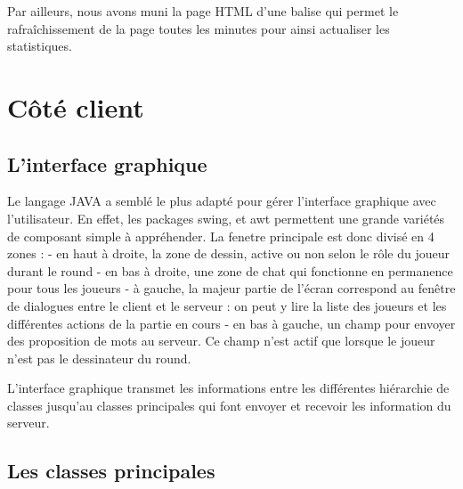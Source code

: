 \documentclass[a4paper, 11pt]{article}
\begin{document}
\bigskip Par ailleurs, nous avons muni la page HTML d’une balise qui
permet le rafraîchissement de la page toutes les minutes pour ainsi
actualiser les statistiques.

\section{Côté client}

\subsection {L'interface graphique}

Le langage JAVA a semblé le plus adapté pour gérer l'interface
graphique avec l'utilisateur. En effet, les packages swing, et awt
permettent une grande variétés de composant simple à appréhender.  La
fenetre principale est donc divisé en 4 zones : - en haut à droite, la
zone de dessin, active ou non selon le rôle du joueur durant le round
- en bas à droite, une zone de chat qui fonctionne en permanence pour
tous les joueurs - à gauche, la majeur partie de l’écran correspond au
fenêtre de dialogues entre le client et le serveur : on peut y lire la
liste des joueurs et les différentes actions de la partie en cours -
en bas à gauche, un champ pour envoyer des proposition de mots au
serveur. Ce champ n'est actif que lorsque le joueur n'est pas le
dessinateur du round.

L'interface graphique transmet les informations entre les différentes
hiérarchie de classes jusqu'au classes principales qui font envoyer
et recevoir les information du serveur.

\subsection{Les classes principales}
\end{document}
